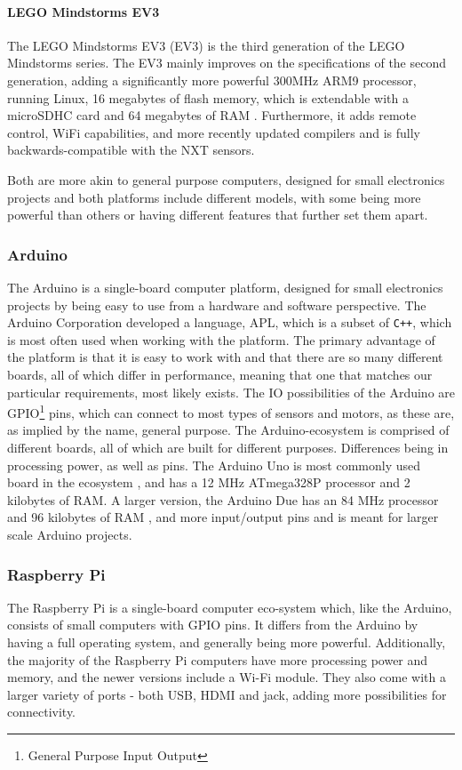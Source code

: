 \paragraph{LEGO Mindstorms EV3}
The  LEGO Mindstorms EV3 (EV3) is the third generation of the LEGO Mindstorms series.
The EV3 mainly improves on the specifications of the second generation, adding a significantly more powerful 300MHz ARM9 processor, running Linux, 16 megabytes of flash memory, which is extendable with a microSDHC card and 64 megabytes of RAM \cite{ev3userguide}.
Furthermore, it adds remote control, WiFi capabilities, and more recently updated compilers and is fully backwards-compatible with the NXT sensors\cite{ev3nxtcompatability}.

Both are more akin to general purpose computers, designed for small electronics projects and both platforms include different models, with some being more powerful than others or having different features that further set them apart.


\subsubsection{Arduino}
The Arduino is a single-board computer platform, designed for small electronics projects by being easy to use from a hardware and software perspective.
The Arduino Corporation developed a language, APL, which is a subset of \texttt{C++}, which is most often used when working with the platform.
The primary advantage of the platform is that it is easy to work with and that there are so many different boards, all of which differ in performance, meaning that one that matches our particular requirements, most likely exists.
The IO possibilities of the Arduino are GPIO\footnote{General Purpose Input Output} pins, which can connect to most types of sensors and motors, as these are, as implied by the name, general purpose.
The Arduino-ecosystem is comprised of different boards, all of which are built for different purposes.
Differences being in processing power, as well as pins.
The Arduino Uno is most commonly used board in the ecosystem \cite{ArduinoUno3}, and has a 12 MHz ATmega328P processor and 2 kilobytes of RAM.
A larger version, the Arduino Due has an 84 MHz processor and 96 kilobytes of RAM \cite{ArduinoDue}, and more input/output pins and is meant for larger scale Arduino projects.

\subsubsection{Raspberry Pi}
The Raspberry Pi is a single-board computer eco-system which, like the Arduino, consists of small computers with GPIO pins.
It differs from the Arduino by having a full operating system, and generally being more powerful.
Additionally, the majority of the Raspberry Pi computers have more processing power and memory, and the newer versions include a Wi-Fi module.
They also come with a larger variety of ports - both USB, HDMI and jack, adding more possibilities for connectivity.


